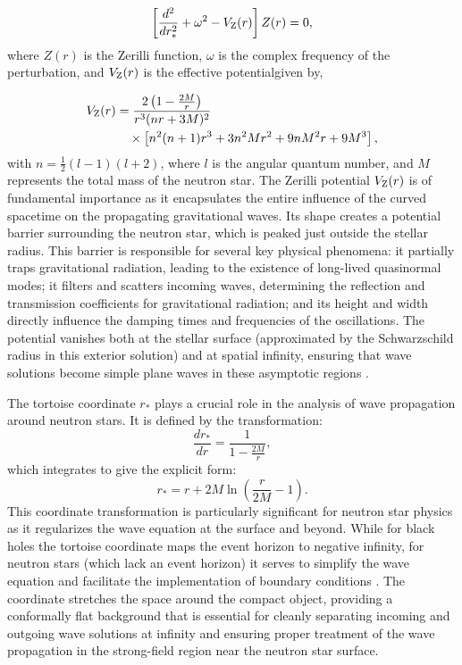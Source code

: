 \begin{equation}
	\left[ \frac{d^2}{dr_*^2} + \omega^2 - V_{\rm Z}(r) \right] Z(r) = 0,
	\label{zerilli_eq}
\end{equation}
\noindent
where \( Z(r) \) is the Zerilli function, \( \omega \) is the complex frequency of the perturbation, and \( V_{\rm Z}(r) \) is the effective potentialgiven by,

\begin{equation}
	\begin{aligned}
		V_{\rm Z}(r) &= \frac{2\left(1 - \frac{2M}{r}\right)}{r^3(nr + 3M)^2} \\
		&\quad \times \left[ n^2(n+1)r^3 + 3n^2 M r^2 + 9n M^2 r + 9M^3 \right],
	\end{aligned}
\end{equation}
\noindent
with \( n = \frac{1}{2}(l-1)(l+2) \), where \( l \) is the angular quantum number, and \( M \) represents the total mass of the neutron star. The Zerilli potential \( V_{\rm Z}(r) \) is of fundamental importance as it encapsulates the entire influence of the curved spacetime on the propagating gravitational waves. Its shape creates a potential barrier surrounding the neutron star, which is peaked just outside the stellar radius. This barrier is responsible for several key physical phenomena: it partially traps gravitational radiation, leading to the existence of long-lived quasinormal modes; it filters and scatters incoming waves, determining the reflection and transmission coefficients for gravitational radiation; and its height and width directly influence the damping times and frequencies of the oscillations. The potential vanishes both at the stellar surface (approximated by the Schwarzschild radius in this exterior solution) and at spatial infinity, ensuring that wave solutions become simple plane waves in these asymptotic regions \cite{Benhar_2004}.

The tortoise coordinate \( r_* \) plays a crucial role in the analysis of wave propagation around neutron stars. It is defined by the transformation:
\begin{equation}
	\frac{d r_*}{d r} = \frac{1}{1 - \frac{2M}{r}},
\end{equation}
which integrates to give the explicit form:
\begin{equation}
	r_* = r + 2M \ln\left(\frac{r}{2M} - 1\right).
	\label{tortoise_def}
\end{equation}
This coordinate transformation is particularly significant for neutron star physics as it regularizes the wave equation at the surface and beyond. While for black holes the tortoise coordinate maps the event horizon to negative infinity, for neutron stars (which lack an event horizon) it serves to simplify the wave equation and facilitate the implementation of boundary conditions \cite{Benhar_2004}. The coordinate stretches the space around the compact object, providing a conformally flat background that is essential for cleanly separating incoming and outgoing wave solutions at infinity and ensuring proper treatment of the wave propagation in the strong-field region near the neutron star surface.



